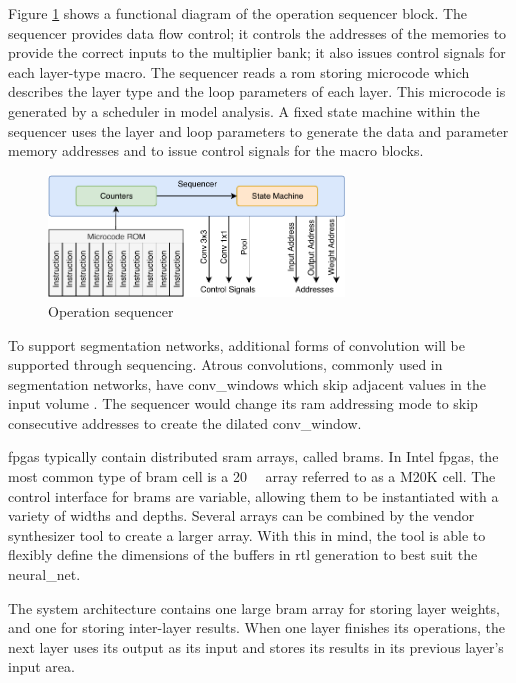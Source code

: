 \documentclass{uw-ece-wkrpt}
\begin{document}
Figure \ref{fig:sequencer} shows a functional diagram of the operation sequencer block. The sequencer provides data flow control; it controls the addresses of the memories to provide the correct inputs to the multiplier bank; it also issues control signals for each layer-type macro. The sequencer reads a \gls{rom} storing microcode which describes the layer type and the loop parameters of each layer. This microcode is generated by a scheduler in model analysis. A fixed state machine within the sequencer uses the layer and loop parameters to generate the data and parameter memory addresses and to issue control signals for the macro blocks.

\begin{figure}
\centering
\includegraphics[width=0.7\textwidth]{figures/sequencer}
\caption{Operation sequencer}\label{fig:sequencer}
\end{figure}

To support segmentation networks, additional forms of convolution will be supported through sequencing. Atrous convolutions, commonly used in segmentation networks, have \glspl{conv_window} which skip adjacent values in the input volume \cite{Chen2018DeepLab:-Semant}. The sequencer would change its \gls{ram} addressing mode to skip consecutive addresses to create the dilated \gls{conv_window}.

\glspl{fpga} typically contain distributed \gls{sram} arrays, called \glspl{bram}. In Intel \glspl{fpga}, the most common type of \gls{bram} cell is a \SI{20}{\kilo\bit} array referred to as a M20K cell. The control interface for \glspl{bram} are variable, allowing them to be instantiated with a variety of widths and depths. Several arrays can be combined by the vendor synthesizer tool to create a larger array. With this in mind, the tool is able to flexibly define the dimensions of the buffers in \gls{rtl} generation to best suit the \gls{neural_net}.

The system architecture contains one large \gls{bram} array for storing layer weights, and one for storing inter-layer results. When one layer finishes its operations, the next layer uses its output as its input and stores its results in its previous layer's input area.
\end{document}
